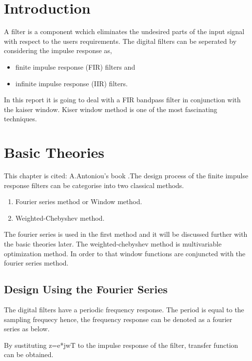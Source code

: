 \documentclass[twoside,12pt,times,onecolumn,a4paper]{report}
\begin{document}
\chapter{Introduction}
\hspace{4em}A filter is a component wchich eliminates the undesired parts of the input signal with respect to the users requirements. The digital filters can be seperated by considering the impulse response as\cite{A.Antoniou},
\begin{itemize}
  \item finite impulse response (FIR) filters and 
  \item infinite impulse response (IIR) filters.
\end{itemize}
In this report it is going to deal with a FIR bandpass filter in conjunction with the kaiser window. Kiser window method is one of the most fascinating techniques.  
\pagebreak


\chapter{Basic Theories}
\hspace{4em}This chapter is cited: A.Antoniou's book \cite{A.Antoniou}.The design process of the finite impulse response filters can be categorise into two classical methods.
\begin{enumerate}
  \item  Fourier series method or Window method.
  \item Weighted-Chebyshev method.
\end{enumerate}
The fourier series is used in the first method and it will be discussed further with the basic theories later. The weighted-chebyshev method is multivariable optimization method. In order to that window functions are conjuncted with the fourier series method.

\section{Design Using the Fourier Series}

\hspace{4em}The digital filters have a periodic frequency response. The period is equal to the sampling frequecy hence, the frequency response can be denoted as a fourier series as below.


By sustituting z=e*jwT to the impulse response of the filter, transfer function can be obtained.
\end{document}
